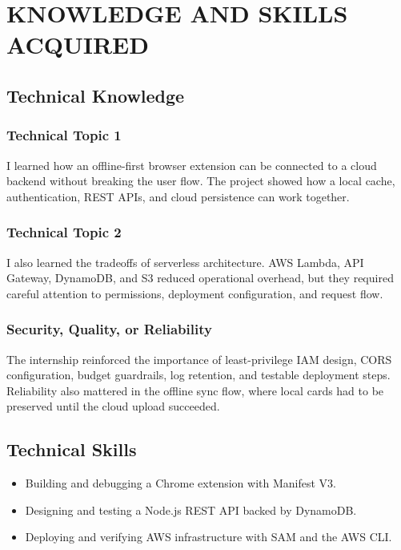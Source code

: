 \chapter{KNOWLEDGE AND SKILLS ACQUIRED}

\section{Technical Knowledge}

\subsection{Technical Topic 1}
I learned how an offline-first browser extension can be connected to a cloud
backend without breaking the user flow. The project showed how a local cache,
authentication, REST APIs, and cloud persistence can work together.

\subsection{Technical Topic 2}
I also learned the tradeoffs of serverless architecture. AWS Lambda, API
Gateway, DynamoDB, and S3 reduced operational overhead, but they required
careful attention to permissions, deployment configuration, and request flow.

\subsection{Security, Quality, or Reliability}
The internship reinforced the importance of least-privilege IAM design, CORS
configuration, budget guardrails, log retention, and testable deployment steps.
Reliability also mattered in the offline sync flow, where local cards had to be
preserved until the cloud upload succeeded.

\section{Technical Skills}

\begin{itemize}
  \item Building and debugging a Chrome extension with Manifest V3.
  \item Designing and testing a Node.js REST API backed by DynamoDB.
  \item Deploying and verifying AWS infrastructure with SAM and the AWS CLI.
\end{itemize}

